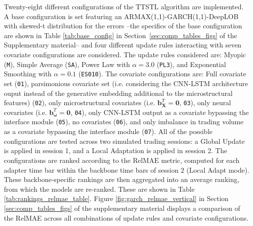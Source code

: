 \documentclass[10pt,a4paper,oneside]{article}
\begin{document}
Twenty-eight different configurations of the TTSTL algorithm are implemented. A base configuration is set featuring an ARMAX(1,1)-GARCH(1,1)-DeepLOB with skewed-t distribution for the errors --the specifics of the base configuration are shown in Table \ref{tab:base_config} in Section~\ref{sec:comp_tables_figs} of the Supplementary material-- and four different update rules interacting with seven covariate configurations are considered. The update rules considered are: Myopic (\verb|M|), Simple Average (\verb|SA|), Power Law with $\alpha = 3.0$ (\verb|PL3|), and Exponential Smoothing with $\alpha = 0.1$ (\verb|ES010|). The covariate configurations are: Full covariate set (\verb|01|), parsimonious covariate set (i.e. considering the CNN-LSTM architecture ouput instead of the generative embedding additional to the microstructural features) (\verb|02|), only microstructural covariates (i.e. $\mathbf{b}^T_{\mathbf{X}} = \mathbf{0}$, \verb|03|), only neural covariates (i.e. $\mathbf{b}^T_{\boldsymbol{\omega}} = \mathbf{0}$, \verb|04|), only CNN-LSTM output as a covariate bypassing the interface module (\verb|05|), no covariates (\verb|06|), and only imbalance in trading volume as a covariate bypassing the interface module (\verb|07|). All of the possible configurations are tested across two simulated trading sessions: a Global Update is applied in session 1, and a Local Adaptation is applied in session 2. The configurations are ranked according to the $\mathrm{RelMAE}$ metric, computed for each adapter time bar within the backbone time bars of session 2 (Local Adapt mode). These backbone-specific rankings are then aggregated into an average ranking, from which the models are re-ranked. These are shown in Table \ref{tab:rankings_relmae_table}. Figure \ref{fig:garch_relmae_vertical} in Section \ref{sec:comp_tables_figs} of the supplementary material displays a comparison of the RelMAE across all combinations of update rules and covariate configurations.
\end{document}
